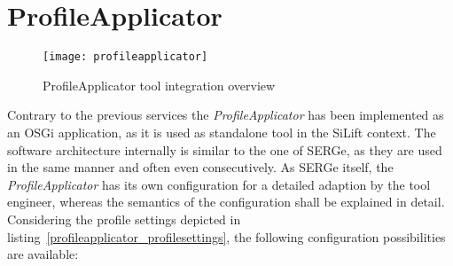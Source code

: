 \section{ProfileApplicator}\label{realization:profileapplicator}
\begin{figure}[h!]
\begin{center}
\texttt{[image: profileapplicator]}\\
\end{center}
\caption{ProfileApplicator tool integration overview}
\label{profileapplicator}
\end{figure}
Contrary to the previous services the \textit{ProfileApplicator} has been
implemented as an OSGi application, as it is used as standalone tool in the SiLift context.
The software architecture internally is similar to the one of \ac{SERGe}, as
they are used in the same manner and often even consecutively. As \ac{SERGe}
itself, the \textit{ProfileApplicator} has its own configuration for a detailed adaption
by the tool engineer, whereas the semantics of the configuration shall be
explained in detail. Considering the profile settings depicted in
listing~\ref{profileapplicator_profilesettings}, the following configuration
possibilities are available:

